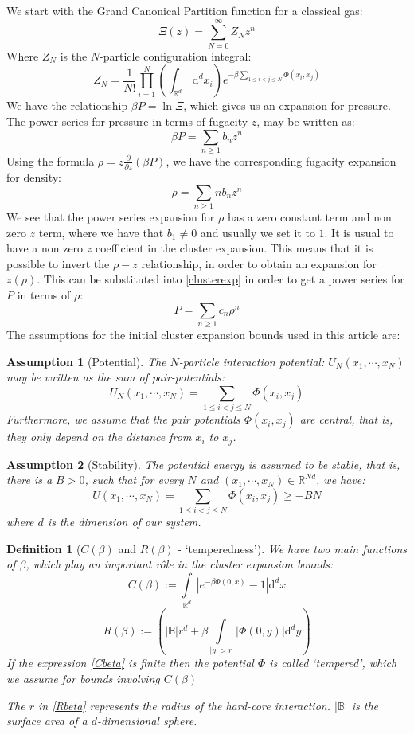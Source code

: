 \documentclass[reqno]{amsart}
\def\be{\begin{equation}}
\def\ee{\end{equation}}
\numberwithin{equation}{section}
\newtheorem{assumption}{Assumption}
\newtheorem{definition}{Definition}
\begin{document}
We start with the Grand Canonical Partition function for a classical gas:
\be \Xi(z)  = \sum\limits_{N=0}^{\infty}Z_Nz^n \ee
Where $Z_N$ is the $N$-particle configuration integral:
\be Z_N = \frac{1}{N!}\prod\limits_{i=1}^N\left(\int_{\mathbb{R}^d}\, \mathrm{d}^dx_i\right) e^{-\beta\sum\limits_{1 \leq i<j \leq N}\Phi(x_i,x_j)} \ee
We have the relationship $\beta P = \ln \Xi$, which gives us an expansion for pressure. 
The power series for pressure in terms of fugacity $z$, may be written as:
\be \beta P = \sum\limits_{n \geq 1}b_nz^n \label{clusterexp} \ee
Using the formula $\rho=z\frac{\partial}{\partial z} (\beta P)$, we have the corresponding fugacity expansion for density:
\be \rho = \sum\limits_{n \geq 1} nb_n z^n \label{clusterexp2} \ee
We see that the power series expansion for $\rho$ has a zero constant term and non zero $z$ term, where we have that $b_1 \neq 0$ and usually we set it to $1$. It is usual to have a non zero $z$ coefficient in the cluster expansion. This means that it is possible to invert the $\rho-z$ relationship, in order to obtain an expansion for $z(\rho)$. This can be substituted into \eqref{clusterexp} in order to get a power series for $P$ in terms of $\rho$:
\be P=\sum\limits_{n \geq 1}c_n \rho^n \label{virialexp} \ee
The assumptions for the initial cluster expansion bounds used in this article are:
\begin{assumption}[Potential]
The $N$-particle interaction potential: $U_N(x_1, \cdots, x_N)$ may be written as the sum of pair-potentials:
\be U_N(x_1, \cdots, x_N)= \sum\limits_{1 \leq i<j \leq N}\Phi(x_i,x_j) \ee
Furthermore, we assume that the pair potentials $\Phi(x_i,x_j)$ are central, that is, they only depend on the distance from $x_i$ to $x_j$.
\end{assumption}
\begin{assumption}[Stability]
\label{ass: stability}
The potential energy is assumed to be stable, that is, there is a $B>0$, such that for every $N$ and $(x_1, \cdots, x_N) \in \mathbb{R}^{Nd}$, we have:
\be U(x_1, \cdots, x_N)=\sum\limits_{1 \leq i<j \leq N}\Phi(x_i,x_j) \geq -BN \ee
where $d$ is the dimension of our system.
\end{assumption}
\begin{definition}[$C(\beta)$ and $R(\beta)$ - `temperedness']
We have two main functions of $\beta$, which play an important r\^{o}le in the cluster expansion bounds:
\be C(\beta):=\int\limits_{\mathbb{R}^d} \, \left|e^{-\beta \Phi(0,x)}-1\right| \mathrm{d}^dx \label{Cbeta} \ee
\be R(\beta):= \left(|\mathbb{B}|r^d+\beta \int\limits_{|y|>r}\, |\Phi(0,y)| \mathrm{d}^dy \right) \label{Rbeta} \ee
If the expression \eqref{Cbeta} is finite then the potential $\Phi$ is called `tempered', which we assume for bounds involving $C(\beta)$

The $r$ in \eqref{Rbeta} represents the radius of the hard-core interaction. $|\mathbb{B}|$ is the surface area of a $d$-dimensional sphere. 
\end{definition}
\end{document}
